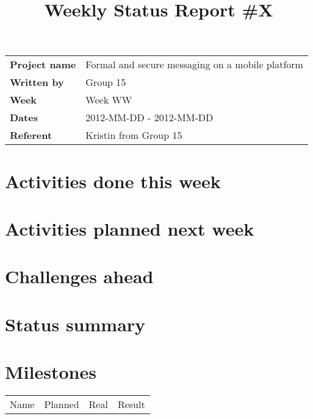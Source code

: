 
\title{Weekly Status Report \#X}
\maketitle
\begin{tabular}{>{\bfseries}l l}	
Project name&Formal and secure messaging on a mobile platform\\
Written by&Group 15\\
Week&Week WW\\
Dates&2012-MM-DD - 2012-MM-DD\\
Referent&Kristin from Group 15\\
\end{tabular}

\section{Activities done this week}
\section{Activities planned next week}
\section{Challenges ahead}
\section{Status summary}
\section{Milestones}
\begin{tabular}{l l l l}	
Name&Planned&Real&Result
\end{tabular}
